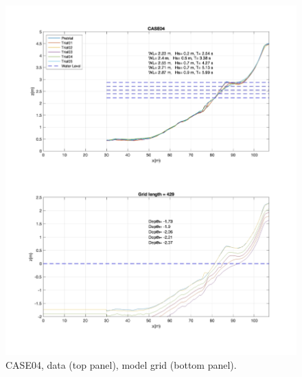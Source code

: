 \documentclass[preprint,10pt]{elsarticle}
\begin{document}
 \begin{figure}
\begin{center}
 \includegraphics[width=1.0\textwidth]{../data/preprocessing/plots/CASE04.jpg}
 \caption{CASE04, data (top panel), model grid (bottom panel).}
 \label{lineargrid}
 \end{center}
 \end{figure}
\end{document}
